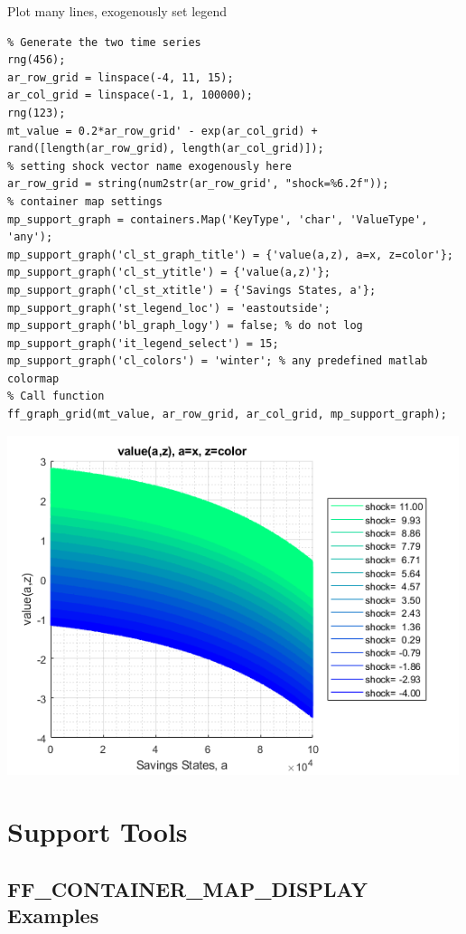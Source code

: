 \documentclass[
]{book}
\begin{document}
Plot many lines, exogenously set legend

\begin{verbatim}
% Generate the two time series
rng(456);
ar_row_grid = linspace(-4, 11, 15);
ar_col_grid = linspace(-1, 1, 100000);
rng(123);
mt_value = 0.2*ar_row_grid' - exp(ar_col_grid) + rand([length(ar_row_grid), length(ar_col_grid)]);
% setting shock vector name exogenously here
ar_row_grid = string(num2str(ar_row_grid', "shock=%6.2f"));
% container map settings
mp_support_graph = containers.Map('KeyType', 'char', 'ValueType', 'any');
mp_support_graph('cl_st_graph_title') = {'value(a,z), a=x, z=color'};
mp_support_graph('cl_st_ytitle') = {'value(a,z)'};
mp_support_graph('cl_st_xtitle') = {'Savings States, a'};
mp_support_graph('st_legend_loc') = 'eastoutside';
mp_support_graph('bl_graph_logy') = false; % do not log
mp_support_graph('it_legend_select') = 15;
mp_support_graph('cl_colors') = 'winter'; % any predefined matlab colormap
% Call function
ff_graph_grid(mt_value, ar_row_grid, ar_col_grid, mp_support_graph);
\end{verbatim}

\includegraphics[width=5.20833in,height=\textheight]{img/fx_graph_grid_images/figure_7.png}

\hypertarget{support-tools}{%
\chapter{Support Tools}\label{support-tools}}

\hypertarget{ff_container_map_display-examples}{%
\section{FF\_CONTAINER\_MAP\_DISPLAY Examples}\label{ff_container_map_display-examples}}
\end{document}
